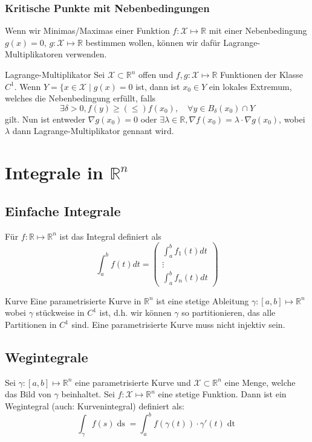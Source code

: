 \documentclass[a4paper,10pt]{article}
\def\R{\mathbb{R}}
\def\X{\mathcal{X}}
\begin{document}
\subsubsection*{Kritische Punkte mit Nebenbedingungen}
Wenn wir Minimas/Maximas einer Funktion \(f: \X \mapsto \R\) mit einer Nebenbedingung \(g(x) = 0,\, g: \X \mapsto \R\) bestimmen wollen, können wir dafür Lagrange-Multiplikatoren verwenden.
\begin{subbox}{Lagrange-Multiplikator}
  Sei \(\X \subset \R^n\) offen und \(f,g: \X \mapsto \R\) Funktionen der Klasse \(C^1\). Wenn \(Y = \{x \in \X \mid g(x) = 0\) ist, dann ist \(x_0 \in Y\) ein lokales Extremum, welches die Nebenbedingung erfüllt, falls 
  \[\exists \delta > 0, f(y) \ge (\le) f(x_0), \quad \forall y \in B_\delta(x_0) \cap Y\]
  gilt. Nun ist entweder \(\nabla g(x_0) = 0\) oder \(\exists \lambda \in \R, \nabla f(x_0) = \lambda \cdot \nabla g(x_0)\), wobei \(\lambda\) dann Lagrange-Multiplikator gennant wird.
\end{subbox}
\section{Integrale in \texorpdfstring{\(\R^n\)}{Rⁿ}}
\subsection{Einfache Integrale}
Für \(f: \R \mapsto \R^n\) ist das Integral definiert als
\[\int_a^b f(t)dt = 
\begin{pmatrix*}
  \int_a^b f_1(t) dt \\
  \vdots\\
  \int_a^b f_n(t) dt
\end{pmatrix*}
\]

\begin{mainbox}{Kurve}
  Eine parametrisierte Kurve in \(\R^n\) ist eine stetige Ableitung \(\gamma: \left[a,b\right] \mapsto \R^n\) wobei \(\gamma\) stückweise in \(C^1\) ist, d.h. wir können \(\gamma\) so partitionieren, das alle Partitionen in \(C^1\) sind. Eine parametrisierte Kurve muss nicht injektiv sein.
\end{mainbox}
\subsection{Wegintegrale}
Sei \(\gamma : \left[a,b\right] \mapsto \R^n\) eine parametrisierte Kurve und \(\X \subset \R^n\) eine Menge, welche das Bild von \(\gamma\) beinhaltet. Sei \(f : \X \mapsto \R^n\) eine stetige Funktion. Dann ist ein Wegintegral (auch: Kurvenintegral) definiert als:
\[\int_\gamma f(s) \mathop{ds} = \int_a^b f(\gamma(t)) \cdot \gamma'(t) \mathop{dt}\]
\end{document}
